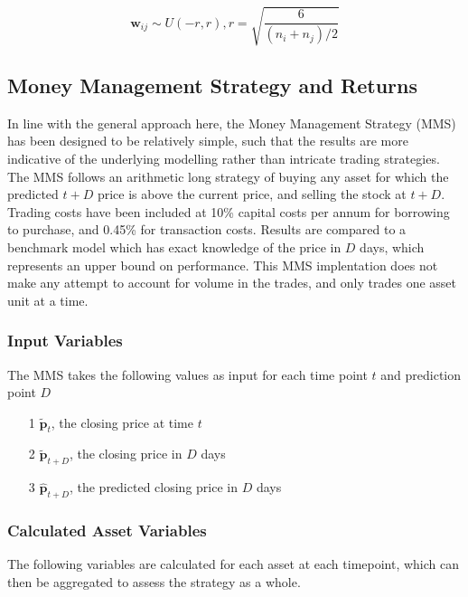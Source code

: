 \documentclass[a4paper,11pt,oneside]{article}
\theoremstyle{plain}
\theoremstyle{definition}
\begin{document}
	\begin{equation}
	\mathbf{w}_{ij} \sim U(-r, r), r = \sqrt{\frac{6}{(n_i + n_j)/2}}
	\end{equation}
	
	
	\subsection{Money Management Strategy and Returns}\label{imp_mms}
	
	In line with the general approach here, the Money Management Strategy (MMS) has been designed to be relatively simple, such that the results are more indicative of the underlying modelling rather than intricate trading strategies. The MMS follows an arithmetic long strategy of buying any asset for which the predicted ${t+D}$ price is above the current price, and selling the stock at ${t+D}$. Trading costs have been included at 10\% capital costs per annum for borrowing to purchase, and 0.45\% for transaction costs. Results are compared to a benchmark model which has exact knowledge of the price in $D$ days, which represents an upper bound on performance. This MMS implentation does not make any attempt to account for volume in the trades, and only trades one asset unit at a time.
	\hfill\break
	
	\subsubsection{Input Variables}
	
	The MMS takes the following values as input for each time point $t$  and prediction point $D$
	\begin{itemize}
		\item [1] {$\mathbf{\tilde{p}}_t$}, the closing price at time $t$
		\item [2] $\mathbf{\tilde{p}}_{t+D}$, the closing price in $D$ days
		\item [3] $\hat{\mathbf{p}}_{t+D}$, the predicted closing price in $D$ days
	\end{itemize}
	
	\subsubsection{Calculated Asset Variables}
	
	The following variables are calculated for each asset at each timepoint, which can then be aggregated to assess the strategy as a whole.
	
\end{document}
